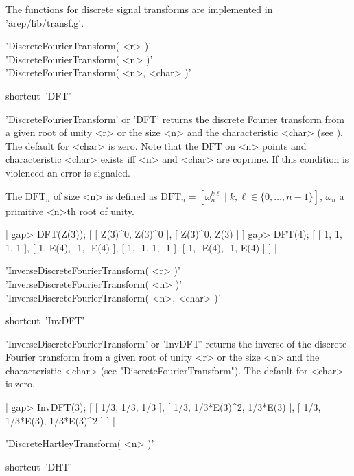 The functions for discrete signal transforms are implemented
in '\"arep/lib/transf.g\"'.

%
%

'DiscreteFourierTransform( <r> )'\\
'DiscreteFourierTransform( <n> )'\\
'DiscreteFourierTransform( <n>, <char> )'

shortcut\:\ 'DFT'

'DiscreteFourierTransform' or 'DFT' returns the discrete Fourier
transform from a given root of unity <r> or the size <n> and 
the characteristic <char> (see \cite{CB93}). 
The default for <char> is zero.
Note that the $\mbox{DFT}$ on <n> points and characteristic <char> exists
iff <n> and <char> are coprime. If this condition is violenced
an error is signaled.

The $\mbox{DFT}_n$ of size <n> is defined as 
$\mbox{DFT}_n = [\omega_n^{k\ell}\mid k,\ell\in\{0,\dots,n-1\}]$, $
\omega_n$ a primitive <n>th root of unity.

|    gap> DFT(Z(3));
    [ [ Z(3)^0, Z(3)^0 ], [ Z(3)^0, Z(3) ] ]
    gap> DFT(4);   
    [ [ 1, 1, 1, 1 ], [ 1, E(4), -1, -E(4) ], [ 1, -1, 1, -1 ], 
      [ 1, -E(4), -1, E(4) ] ] |

%
%

'InverseDiscreteFourierTransform( <r> )'\\
'InverseDiscreteFourierTransform( <n> )'\\
'InverseDiscreteFourierTransform( <n>, <char> )'

shortcut\:\ 'InvDFT'

'InverseDiscreteFourierTransform' or 'InvDFT' returns the inverse
of the discrete Fourier transform from a given root of unity <r> 
or the size <n> and the characteristic <char> 
(see "DiscreteFourierTransform"). The default for <char> is zero.

|    gap> InvDFT(3);
    [ [ 1/3, 1/3, 1/3 ], [ 1/3, 1/3*E(3)^2, 1/3*E(3) ], 
      [ 1/3, 1/3*E(3), 1/3*E(3)^2 ] ] |

%

'DiscreteHartleyTransform( <n> )'

shortcut\:\ 'DHT'

